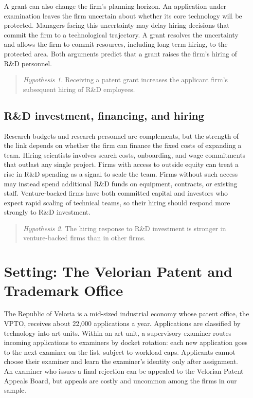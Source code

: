 \documentclass[11pt]{article}
\begin{document}
A grant can also change the firm's planning horizon. An application under examination leaves the firm uncertain about whether its core technology will be protected. Managers facing this uncertainty may delay hiring decisions that commit the firm to a technological trajectory. A grant resolves the uncertainty and allows the firm to commit resources, including long-term hiring, to the protected area. Both arguments predict that a grant raises the firm's hiring of R\&D personnel.

\begin{quote}
\textit{Hypothesis 1.} Receiving a patent grant increases the applicant firm's subsequent hiring of R\&D employees.
\end{quote}

\subsection{R\&D investment, financing, and hiring}

Research budgets and research personnel are complements, but the strength of the link depends on whether the firm can finance the fixed costs of expanding a team. Hiring scientists involves search costs, onboarding, and wage commitments that outlast any single project. Firms with access to outside equity can treat a rise in R\&D spending as a signal to scale the team. Firms without such access may instead spend additional R\&D funds on equipment, contracts, or existing staff. Venture-backed firms have both committed capital and investors who expect rapid scaling of technical teams, so their hiring should respond more strongly to R\&D investment.

\begin{quote}
\textit{Hypothesis 2.} The hiring response to R\&D investment is stronger in venture-backed firms than in other firms.
\end{quote}

\section{Setting: The Velorian Patent and Trademark Office}

The Republic of Veloria is a mid-sized industrial economy whose patent office, the VPTO, receives about 22,000 applications a year. Applications are classified by technology into art units. Within an art unit, a supervisory examiner routes incoming applications to examiners by docket rotation: each new application goes to the next examiner on the list, subject to workload caps. Applicants cannot choose their examiner and learn the examiner's identity only after assignment. An examiner who issues a final rejection can be appealed to the Velorian Patent Appeals Board, but appeals are costly and uncommon among the firms in our sample.
\end{document}
